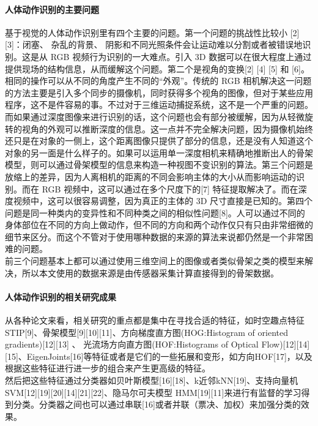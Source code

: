 \paragraph{人体动作识别的主要问题}\label{ux4ebaux4f53ux52a8ux4f5cux8bc6ux522bux7684ux4e3bux8981ux95eeux9898}

基于视觉的人体动作识别里有四个主要的问题。第一个问题的挑战性比较小
{[}2{]} {[}3{]}：闭塞、 杂乱的背景、
阴影和不同光照条件会让运动难以分割或者被错误地识别。这是从 RGB
视频行为识别的一大难点。引入 3D
数据可以在很大程度上通过提供现场的结构信息，从而缓解这个问题。第二个是视角的变换{[}2{]}
{[}4{]} {[}5{]} 和
{[}6{]}。相同的操作可以从不同的角度产生不同的``外观''。传统的 RGB
相机解决这一问题的方法主要是引入多个同步的摄像机，同时获得多个视角的图像，但对于某些应用程序，这不是件容易的事。不过对于三维运动捕捉系统，这不是一个严重的问题。而如果通过深度图像来进行识别的话，这个问题也会有部分被缓解，因为从轻微旋转的视角的外观可以推断深度的信息。这一点并不完全解决问题，因为摄像机始终还只是在对象的一侧上，这个距离图像只提供了部分的信息，还是没有人知道这个对象的另一面是什么样子的。如果可以运用单一深度相机来精确地推断出人的骨架模型，则可以通过骨架模型的信息来构造一种视图不变识别的算法。第三个问题是放缩上的差异，因为人离相机的距离的不同会影响主体的大小从而影响运动的识别。而在
RGB 视频中，这可以通过在多个尺度下的{[}7{]}
特征提取解决了。而在深度视频中，这可以很容易调整，因为真正的主体的 3D
尺寸直接是已知的。第四个问题是同一种类内的变异性和不同种类之间的相似性问题{[}8{]}。人可以通过不同的身体部位在不同的方向上做动作，但不同的方向和两个动作仅只有只由非常细微的细节来区分。而这个不管对于使用哪种数据的来源的算法来说都仍然是一个非常困难的问题。\\前三个问题基本上都可以通过使用三维空间上的图像或者类似骨架之类的模型来解决，所以本文使用的数据来源是由传感器采集计算直接得到的骨架数据。

\paragraph{人体动作识别的相关研究成果}\label{ux4ebaux4f53ux52a8ux4f5cux8bc6ux522bux7684ux76f8ux5173ux7814ux7a76ux6210ux679c}

从各种论文来看，相关研究的重点都是集中在寻找合适的特征，如时空趣点特征STIP{[}9{]}、骨架模型{[}9{]}{[}10{]}{[}11{]}、方向梯度直方图(HOG:Histogram
of oriented gradients){[}12{]}{[}13{]} 、
光流场方向直方图(HOF:Histograms of Optical
Flow){[}12{]}{[}14{]}{[}15{]}、EigenJoints{[}16{]}等特征或者是它们的一些拓展和变形，如方向HOF{[}17{]}，以及根据这些特征进行进一步的组合来产生更高级的特征。\\然后把这些特征通过分类器如贝叶斯模型{[}16{]}{[}18{]}、k近邻kNN{[}19{]}、支持向量机
SVM{[}12{]}{[}19{]}{[}20{]}{[}14{]}{[}21{]}{[}22{]}、隐马尔可夫模型
HMM{[}19{]}{[}11{]}来进行有监督的学习得到分类。分类器之间也可以通过串联{[}16{]}或者并联（票决、加权）来加强分类的效果。

